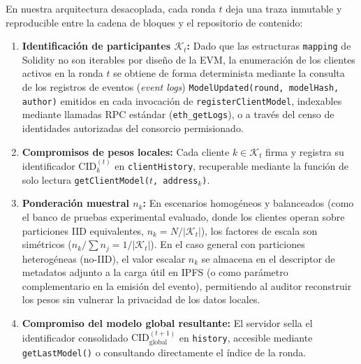 En nuestra arquitectura desacoplada, cada ronda $t$ deja una traza inmutable y reproducible entre la cadena de bloques y el repositorio de contenido:
\begin{enumerate}
    \item \textbf{Identificación de participantes $\mathcal{K}_t$:} Dado que las estructuras \texttt{mapping} de Solidity no son iterables por diseño de la EVM, la enumeración de los clientes activos en la ronda $t$ se obtiene de forma determinista mediante la consulta de los registros de eventos (\textit{event logs}) \texttt{ModelUpdated(round, modelHash, author)} emitidos en cada invocación de \texttt{registerClientModel}, indexables mediante llamadas RPC estándar (\texttt{eth\_getLogs}), o a través del censo de identidades autorizadas del consorcio permisionado.
    \item \textbf{Compromisos de pesos locales:} Cada cliente $k \in \mathcal{K}_t$ firma y registra su identificador $\text{CID}_k^{(t)}$ en \texttt{clientHistory}, recuperable mediante la función de solo lectura \texttt{getClientModel($t$, address$_k$)}.
    \item \textbf{Ponderación muestral $n_k$:} En escenarios homogéneos y balanceados (como el banco de pruebas experimental evaluado, donde los clientes operan sobre particiones IID equivalentes, $n_k = N / |\mathcal{K}_t|$), los factores de escala son simétricos ($n_k / \sum n_j = 1/|\mathcal{K}_t|$). En el caso general con particiones heterogéneas (no-IID), el valor escalar $n_k$ se almacena en el descriptor de metadatos adjunto a la carga útil en IPFS (o como parámetro complementario en la emisión del evento), permitiendo al auditor reconstruir los pesos sin vulnerar la privacidad de los datos locales.
    \item \textbf{Compromiso del modelo global resultante:} El servidor sella el identificador consolidado $\text{CID}_{\text{global}}^{(t+1)}$ en \texttt{history}, accesible mediante \texttt{getLastModel()} o consultando directamente el índice de la ronda.
\end{enumerate}

